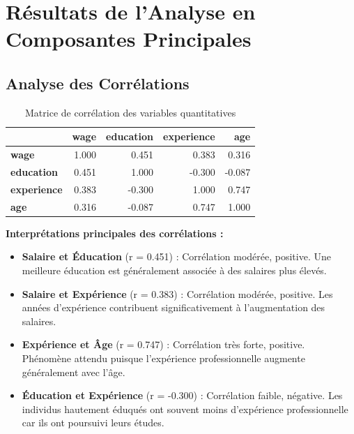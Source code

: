 \documentclass[12pt,a4paper]{report}
\begin{document}
\section{Résultats de l'Analyse en Composantes Principales}

\subsection{Analyse des Corrélations}

\begin{table}[H]
\centering
\caption{Matrice de corrélation des variables quantitatives}
\begin{tabular}{|l|r|r|r|r|}
\hline
 & \textbf{wage} & \textbf{education} & \textbf{experience} & \textbf{age} \\
\hline
\textbf{wage} & 1.000 & 0.451 & 0.383 & 0.316 \\
\hline
\textbf{education} & 0.451 & 1.000 & -0.300 & -0.087 \\
\hline
\textbf{experience} & 0.383 & -0.300 & 1.000 & 0.747 \\
\hline
\textbf{age} & 0.316 & -0.087 & 0.747 & 1.000 \\
\hline
\end{tabular}
\end{table}

\textbf{Interprétations principales des corrélations :}

\begin{itemize}
    \item \textbf{Salaire et Éducation} (r = 0.451) : Corrélation modérée, positive. Une meilleure éducation est généralement associée à des salaires plus élevés.
    
    \item \textbf{Salaire et Expérience} (r = 0.383) : Corrélation modérée, positive. Les années d'expérience contribuent significativement à l'augmentation des salaires.
    
    \item \textbf{Expérience et Âge} (r = 0.747) : Corrélation très forte, positive. Phénomène attendu puisque l'expérience professionnelle augmente généralement avec l'âge.
    
    \item \textbf{Éducation et Expérience} (r = -0.300) : Corrélation faible, négative. Les individus hautement éduqués ont souvent moins d'expérience professionnelle car ils ont poursuivi leurs études.
\end{itemize}
\end{document}
